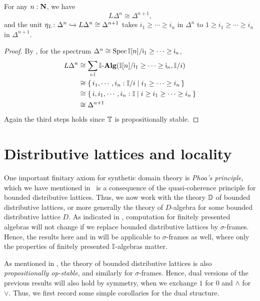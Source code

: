 
\begin{corollary}[\AxiomSQCI]
  For any $n : \mathbf{N}$, we have
  \[ L\Delta^n \cong \Delta^{n+1}\text{,} \]
  and the unit $\eta_L \colon \Delta^n \hookrightarrow L\Delta^n \cong \Delta^{n+1}$ takes $i_1 \ge \cdots \ge i_n$ in $\Delta^n$ to $1 \ge i_1 \ge \cdots \ge i_n$ in $\Delta^{n+1}$. 
\end{corollary}
\begin{proof}
  By , for the spectrum $\Delta^n \cong \operatorname{Spec}\mathbb{I}[n]/\mathsf{i}_1 \ge \cdots \ge \mathsf{i}_n$,
  \begin{align*}
    L\Delta^n
    &\cong \sum_{i:\I}\I\alg(\I[n]/\ms{i}_1\ge\cdots\ge \ms{i}_n,\I/i) \\
    &\cong \scomp{i_1,\cdots,i_n:\I/i}{i_1 \ge \cdots \ge i_n} \\
    &\cong \scomp{i,i_1,\cdots,i_n:\I}{i \ge i_1 \ge \cdots \ge i_n} \\
    &\cong \Delta^{n+1}
  \end{align*}
  Again the third steps holds since $\mathbb{T}$ is propositionally stable.
\end{proof}

\section{Distributive lattices and locality}\label{sec:locality}

One important finitary axiom for synthetic domain theory is \emph{Phoa's principle}, which we have mentioned in~ is a consequence of the quasi-coherence principle for bounded distributive lattices. 
Thus, we now work with the theory $\mathbb{D}$ of bounded distributive lattices, or more generally the theory of $D$-algebra for some bounded distributive lattice $D$. As indicated in , computation for finitely presented algebras 
will not change if we replace bounded distributive lattices by $\sigma$-frames. Hence, the results here and in  will be applicable to $\sigma$-frames as well, where only the properties of finitely presented $\mathbb{I}$-algebras matter.

As mentioned in , the theory of bounded distributive lattices is also \emph{propositionally op-stable}, and similarly for $\sigma$-frames. Hence, dual versions of the previous results will also hold by symmetry, when we exchange $1$ for $0$ and $\wedge$ for $\vee$. Thus, we first record some simple corollaries for the dual structure.

